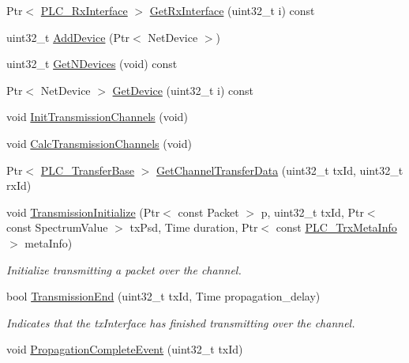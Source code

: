 \begin{DoxyCompactItemize}
\item 
\-Ptr$<$ \hyperlink{classns3_1_1PLC__RxInterface}{\-P\-L\-C\-\_\-\-Rx\-Interface} $>$ \hyperlink{classns3_1_1PLC__Channel_aa9fe1d783e2d3662649835c99232f04d}{\-Get\-Rx\-Interface} (uint32\-\_\-t i) const 
\item 
uint32\-\_\-t \hyperlink{classns3_1_1PLC__Channel_ad89f6779ad4976cd5acfbe072996eff6}{\-Add\-Device} (\-Ptr$<$ \-Net\-Device $>$)
\item 
uint32\-\_\-t \hyperlink{classns3_1_1PLC__Channel_abf943700252f5244e10ba042f142ee6f}{\-Get\-N\-Devices} (void) const 
\item 
\-Ptr$<$ \-Net\-Device $>$ \hyperlink{classns3_1_1PLC__Channel_a3b85c19d252573c3efc1578613b22f9d}{\-Get\-Device} (uint32\-\_\-t i) const 
\item 
void \hyperlink{classns3_1_1PLC__Channel_a9210af0d915d96817f77e21000deb5a5}{\-Init\-Transmission\-Channels} (void)
\item 
void \hyperlink{classns3_1_1PLC__Channel_a2bb68af9c30a3d0c4f7a264c4e90ddab}{\-Calc\-Transmission\-Channels} (void)
\item 
\-Ptr$<$ \hyperlink{classns3_1_1PLC__ValueBase}{\-P\-L\-C\-\_\-\-Transfer\-Base} $>$ \hyperlink{classns3_1_1PLC__Channel_ae0ccd3520dbb21ed05cb006f817a89c7}{\-Get\-Channel\-Transfer\-Data} (uint32\-\_\-t tx\-Id, uint32\-\_\-t rx\-Id)
\item 
void \hyperlink{classns3_1_1PLC__Channel_adeb6bba5a291bd4508c20dae60d46ce6}{\-Transmission\-Initialize} (\-Ptr$<$ const \-Packet $>$ p, uint32\-\_\-t tx\-Id, \-Ptr$<$ const \-Spectrum\-Value $>$ tx\-Psd, \-Time duration, \-Ptr$<$ const \hyperlink{classns3_1_1PLC__TrxMetaInfo}{\-P\-L\-C\-\_\-\-Trx\-Meta\-Info} $>$ meta\-Info)
\begin{DoxyCompactList}\small\item\em \-Initialize transmitting a packet over the channel. \end{DoxyCompactList}\item 
bool \hyperlink{classns3_1_1PLC__Channel_ab856d23667e7f0ac87a2c95a482a695c}{\-Transmission\-End} (uint32\-\_\-t tx\-Id, \-Time propagation\-\_\-delay)
\begin{DoxyCompactList}\small\item\em \-Indicates that the tx\-Interface has finished transmitting over the channel. \end{DoxyCompactList}\item 
void \hyperlink{classns3_1_1PLC__Channel_a787ab20c1ee23c65a47de50adb917a68}{\-Propagation\-Complete\-Event} (uint32\-\_\-t tx\-Id)

\end{DoxyCompactItemize}
